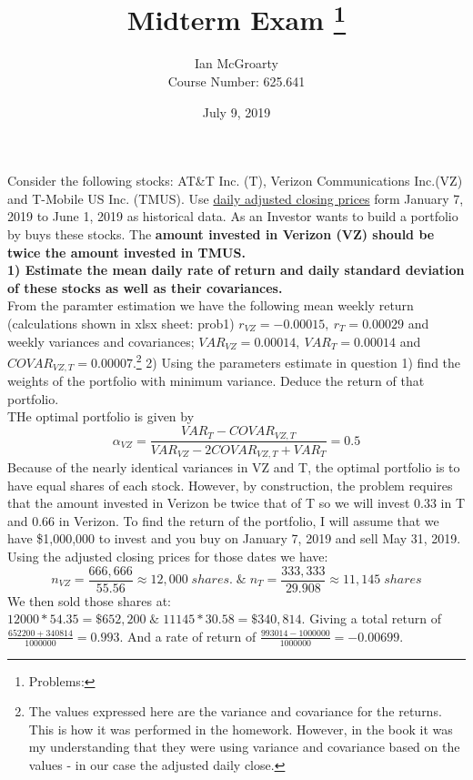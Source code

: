 \documentclass[12pt]{article}
\title{Midterm Exam \thanks{Problems:}}
\author{Ian McGroarty \\
	Course Number: 625.641}
\date{July 9, 2019}
\newenvironment{problem}[3][Problem]{\begin{trivlist}
\item[\hskip \labelsep {\bfseries #1}\hskip \labelsep {\bfseries #2.}]}{\end{trivlist}}
\begin{document}
\maketitle
\newpage
\begin{problem}{1 (30 points)} \\
Consider the following stocks:  
AT\&T Inc. (T),
 Verizon Communications Inc.(VZ) and 
 T-Mobile US Inc. (TMUS). Use 
 \underline{daily adjusted closing prices} form 
 January 7, 2019 to June 1, 2019
  as historical data. As an Investor wants to build a portfolio by buys these stocks.
 The \textbf{amount invested in Verizon (VZ) should be twice the amount invested in TMUS.} \\
\textbf{ 1) Estimate the mean daily rate of return and daily standard deviation of these stocks as well as their covariances.}\\
From the paramter estimation we have the following mean weekly return (calculations shown in xlsx sheet: prob1) $r_{VZ} = -0.00015, \ r_T = 0.00029$ and weekly variances and covariances; $VAR_{VZ}=0.00014, \ VAR_T = 0.00014$ and $COVAR_{VZ,T} = 0.00007$.\footnote{The values expressed here are the variance and covariance for the returns. This is how it was performed in the homework. However, in the book it was my understanding that they were using variance and covariance based on the values - in our case the adjusted daily close.}
\newpage
2) Using the parameters estimate in question 1) find the weights of the portfolio with minimum variance. Deduce the return of that portfolio. \\
THe optimal portfolio is given by 
$$ \alpha_{VZ} = \frac{VAR_T - COVAR_{VZ,T}}{VAR_{VZ}-2COVAR_{VZ,T}+VAR_T} = 0.5$$
Because of the nearly identical variances in VZ and T, the optimal portfolio is to have equal shares of each stock. However, by construction, the problem requires that the amount invested in Verizon be twice that of T so we will invest 0.33 in T and 0.66 in Verizon. To find the return of the portfolio, I will assume that we have \$1,000,000 to invest and you buy on January 7, 2019 and sell May 31, 2019. Using the adjusted closing prices for those dates we have: 
$$n_{VZ} = \frac{666,666}{55.56}\approx 12,000 \; shares. \; \& \; n_T = \frac{333,333}{29.908} \approx 11,145 \; shares$$
We then sold those shares at: $12000*54.35 = \$652,200 \; \& \; 11145*30.58 = \$340,814$. Giving a total return of $\frac{652200+340814}{1000000}=0.993.$ And a rate of return of $\frac{993014-1000000}{1000000}=-0.00699$. 
\end{problem}
\end{document}
